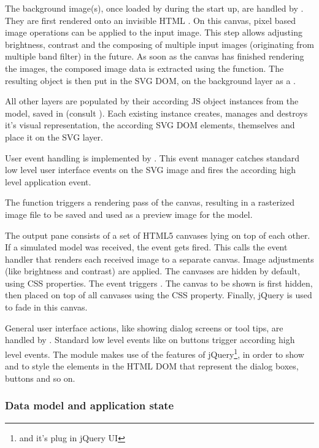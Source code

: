 The background image(s), once loaded by  during the start up, are handled by .
They are first rendered onto an invisible HTML .
On this canvas, pixel based image operations can be applied to the input image.
This step allows adjusting brightness, contrast and the composing of multiple input images (originating from multiple band filter) in the future.
As soon as the canvas has finished rendering the images, the composed image data is extracted using the  function.
The resulting object is then put in the SVG DOM, on the background layer as a .

All other layers are populated by their according JS object instances from the model, saved in  (consult ).
Each existing instance creates, manages and destroys it's visual representation, the according SVG DOM elements, themselves and place it on the SVG layer.

User event handling is implemented by .
This event manager catches standard low level user interface events on the SVG image and fires the according high level application event.

The function  triggers a rendering pass of the canvas, resulting in a rasterized image file to be saved and used as a preview image for the model.


The output pane  consists of a set of HTML5 canvases lying on top of each other.
If a simulated model was received, the event  gets fired.
This calls the event handler  that renders each received image to a separate canvas.
Image adjustments (like brightness and contrast) are applied.
The canvases are hidden by default, using CSS properties.
The event  triggers .
The canvas to be shown is first hidden, then placed on top of all canvases using the CSS  property.
Finally, jQuery is used to fade in this canvas.


General user interface actions, like showing dialog screens or tool tips, are handled by .
Standard low level events like  on buttons trigger according high level events.
The module  makes use of the features of jQuery\footnote{and it's plug in jQuery UI}, in order to show and to style the elements in the HTML DOM that represent the dialog boxes, buttons and so on.



\subsubsection{Data model and application state}
\label{sec:state}

